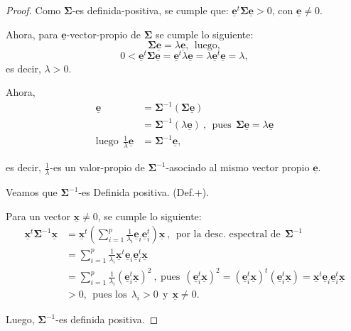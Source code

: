 \documentclass[
]{book}
\theoremstyle{definition}
\theoremstyle{definition}
\theoremstyle{definition}
\theoremstyle{definition}
\theoremstyle{remark}
\begin{document}
\begin{proof}
Como \(\mathbf{\Sigma}\)-es definida-positiva, se cumple que: \(\underline{\mathbf{e}}^t\mathbf{\Sigma} \underline{\mathbf{e}}>0\), con \(\underline{\mathbf{e}} \neq 0\).

Ahora, para \(\underline{\mathbf{e}}\)-vector-propio de \(\mathbf{\Sigma}\) se cumple lo siguiente:
\[
\mathbf{\Sigma} \underline{\mathbf{e}}=\lambda \underline{\mathbf{e}}, \ \ \text{luego},
\]
\[
0<\underline{\mathbf{e}}^t\mathbf{\Sigma} \underline{\mathbf{e}}=\underline{\mathbf{e}}^t\lambda \underline{\mathbf{e}}=\lambda \underline{\mathbf{e}}^t\underline{\mathbf{e}}=\lambda,
\]
es decir, \(\lambda>0\).

Ahora,
\begin{align*}
\underline{\mathbf{e}}&=\mathbf{\Sigma}^{-1}(\mathbf{\Sigma}\underline{\mathbf{e}})\\
&=\mathbf{\Sigma}^{-1}(\lambda \underline{\mathbf{e}}) \ , \ \ \text{pues} \ \ \mathbf{\Sigma}\underline{\mathbf{e}}=\lambda \underline{\mathbf{e}}\\
\text{luego} \ \ \frac{1}{\lambda}\underline{\mathbf{e}} &= \mathbf{\Sigma}^{-1} \underline{\mathbf{e}},
\end{align*}

es decir, \(\frac{1}{\lambda}\)-es un valor-propio de \(\mathbf{\Sigma}^{-1}\)-asociado al mismo vector propio \(\underline{\mathbf{e}}\).

Veamos que \(\mathbf{\Sigma}^{-1}\)-es Definida positiva. (Def.+).

Para un vector \(\underline{\mathbf{x}}\neq 0\), se cumple lo siguiente:
\begin{align*}
\underline{\mathbf{x}}^t\mathbf{\Sigma}^{-1} \underline{\mathbf{\mathbf{x}}} &= \underline{\mathbf{x}}^t \left( \sum_{i=1}^p \frac{1}{\lambda_i} \underline{\mathbf{e}}_i\underline{\mathbf{e}}_i^t \right) \underline{\mathbf{x}}\ , \ \ \text{por la desc. espectral de} \ \ \mathbf{\Sigma}^{-1}\\
&= \sum_{i=1}^p \frac{1}{\lambda_i} \underline{\mathbf{x}}^t \underline{\mathbf{e}}_i\underline{\mathbf{e}}_i^t  \underline{\mathbf{x}}\\
&= \sum_{i=1}^p \frac{1}{\lambda_i} ( \underline{\mathbf{e}}_i^t \underline{\mathbf{x}})^2\ , \ \text{pues} \ \ (\underline{\mathbf{e}}_i^t \underline{\mathbf{x}})^2= (\underline{\mathbf{e}}_i^t \underline{\mathbf{x}})^t(\underline{\mathbf{e}}_i^t \underline{\mathbf{x}})=\underline{\mathbf{x}}^t \underline{\mathbf{e}}_i\underline{\mathbf{e}}_i^t  \underline{\mathbf{x}}  \\
&>0, \ \ \text{pues los} \ \ \lambda_i>0 \ \ \text{y} \ \ \underline{\mathbf{x}}\neq 0.
\end{align*}

Luego, \(\mathbf{\Sigma}^{-1}\)-es definida positiva.
\end{proof}
\end{document}
